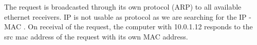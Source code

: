 The request is broadcasted through its own protocol (ARP) to all available ethernet receivers.
IP is not usable as protocol as we are searching for the IP - MAC .
On receival of the request, the computer with 10.0.1.12 responds to the src mac address of the request with its own MAC address.
